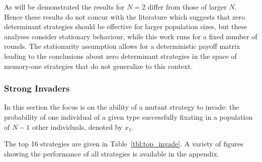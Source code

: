 \documentclass[10pt,letterpaper]{article}
\begin{document}
As will be demonstrated the results for
\(N=2\) differ from those of larger $N$. Hence these results do not concur with
the literature which suggests that zero determinant strategies should be
effective for larger population sizes, but these analyses consider stationary
behaviour, while this work runs for a fixed number of rounds. \cite{stewart2013extortion}
The stationarity assumption allows for a deterministic payoff matrix
leading to the conclusions about zero determinant strategies in the space
of memory-one strategies that do not generalize to this context.


\subsubsection*{Strong Invaders}

In this section the focus is on the ability of a mutant strategy to invade: the
probability of one individual of a given type successfully fixating in a
population of \(N - 1\) other individuals, denoted by \(x_1\).

The top 16 strategies are given in Table~\ref{tbl:top_invade}. A variety of
figures showing the performance of all strategies is available in the
appendix.
\end{document}
